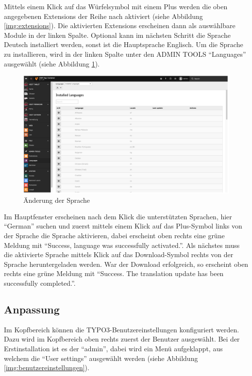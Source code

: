 Mittels einem Klick auf das Würfelsymbol mit einem Plus werden die oben angegebenen Extensions der Reihe nach aktiviert (siehe Abbildung \ref{img:extensions}). Die aktivierten Extensions erscheinen dann als auswählbare Module in der linken Spalte.
Optional kann im nächsten Schritt die Sprache Deutsch installiert werden, sonst ist die Hauptsprache Englisch. Um die Sprache zu installieren, wird in der linken Spalte unter den ADMIN TOOLS “Languages” ausgewählt (siehe Abbildung \ref{img:sprache_aendern}).

\begin{figure}[ht!]
\centering
\includegraphics[width=12cm]{Figures/paula/typo3/sprache_aendern.png}
\caption{Änderung der Sprache}
\label{img:sprache_aendern}
\end{figure}

Im Hauptfenster erscheinen nach dem Klick die unterstützten Sprachen, hier “German” suchen und zuerst mittels einem Klick auf das Plus-Symbol links von der Sprache die Sprache aktivieren, dabei erscheint oben rechts eine grüne Meldung mit “Success, language was successfully activated.”. Als nächstes muss die aktivierte Sprache mittels Klick auf das Download-Symbol rechts von der Sprache heruntergeladen werden. War der Download erfolgreich, so erscheint oben rechts eine grüne Meldung mit “Success. The translation update has been successfully completed.”.

\subsection{Anpassung}

Im Kopfbereich können die TYPO3-Benutzereinstellungen konfiguriert werden. Dazu wird im Kopfbereich oben rechts zuerst der Benutzer ausgewählt. Bei der Erstinstallation ist es der “admin”, dabei wird ein Menü aufgeklappt, aus welchem die “User settings” ausgewählt werden (siehe Abbildung \ref{img:benutzereinstellungen}).

